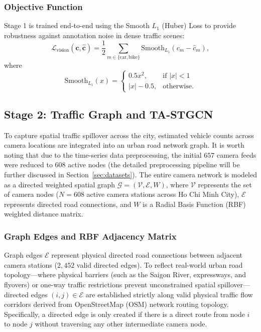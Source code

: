 \documentclass[journal,twocolumn]{IEEEtran}
\begin{document}
\subsubsection{Objective Function}
Stage 1 is trained end-to-end using the Smooth $L_1$ (Huber) Loss \cite{huber} to provide robustness against annotation noise in dense traffic scenes:
\begin{equation}
\mathcal{L}_{\text{vision}}(\mathbf{c}, \hat{\mathbf{c}}) = \frac{1}{2} \sum_{m \in \{\text{car}, \text{bike}\}} \text{Smooth}_{L_1}\left(c_m - \hat{c}_m\right),
\end{equation}
where
\begin{equation}
\text{Smooth}_{L_1}(x) = \begin{cases} 0.5 x^2, & \text{if } |x| < 1 \\ |x| - 0.5, & \text{otherwise.} \end{cases}
\end{equation}

\subsection{Stage 2: Traffic Graph and TA-STGCN}
\label{sec:stage2}
\label{sec:graph_tastgcn}

To capture spatial traffic spillover across the city, estimated vehicle counts across camera locations are integrated into an urban road network graph. It is worth noting that due to the time-series data preprocessing, the initial $657$ camera feeds were reduced to $608$ active nodes (the detailed preprocessing pipeline will be further discussed in Section~\ref{sec:datasets}). The entire camera network is modeled as a directed weighted spatial graph $\mathcal{G} = (\mathcal{V}, \mathcal{E}, W)$, where $\mathcal{V}$ represents the set of camera nodes ($N=608$ active camera stations across Ho Chi Minh City), $\mathcal{E}$ represents directed road connections, and $W$ is a Radial Basis Function (RBF) weighted distance matrix.

\subsubsection{Graph Edges and RBF Adjacency Matrix}
Graph edges $\mathcal{E}$ represent physical directed road connections between adjacent camera stations ($2,452$ valid directed edges). To reflect real-world urban road topology—where physical barriers (such as the Saigon River, expressways, and flyovers) or one-way traffic restrictions prevent unconstrained spatial spillover—directed edges $(i,j) \in \mathcal{E}$ are established strictly along valid physical traffic flow corridors derived from OpenStreetMap (OSM) network routing topology. Specifically, a directed edge is only created if there is a direct route from node $i$ to node $j$ without traversing any other intermediate camera node.
\end{document}
